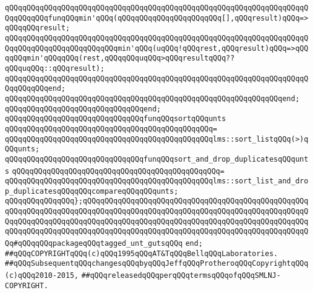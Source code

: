 \verb|qQQqqQQqqQQqqQQqqQQqqQQqqQQqqQQqqQQqqQQqqQQqqQQqqQQqqQQqqQQqqQQqqQQqqQQqqQQqqQQqfunqQQqmin'qQQq(qQQqqQQqqQQqqQQqqQQqqQQq[],qQQqresult)qQQq=>qQQqqQQqresult;|\newline
\verb|qQQqqQQqqQQqqQQqqQQqqQQqqQQqqQQqqQQqqQQqqQQqqQQqqQQqqQQqqQQqqQQqqQQqqQQqqQQqqQQqqQQqqQQqqQQqqQQqmin'qQQq(uqQQq!qQQqrest,qQQqresult)qQQq=>qQQqqQQqmin'qQQqqQQq(rest,qQQqqQQquqQQq>qQQqresultqQQq??qQQquqQQq::qQQqresult);|\newline
\verb|qQQqqQQqqQQqqQQqqQQqqQQqqQQqqQQqqQQqqQQqqQQqqQQqqQQqqQQqqQQqqQQqqQQqqQQqqQQqqQQqend;|\newline
\verb|qQQqqQQqqQQqqQQqqQQqqQQqqQQqqQQqqQQqqQQqqQQqqQQqqQQqqQQqqQQqqQQqend;|\newline
\verb|qQQqqQQqqQQqqQQqqQQqqQQqqQQqqQQqend;|\newline
\newline
\verb|qQQqqQQqqQQqqQQqqQQqqQQqqQQqqQQqfunqQQqsortqQQqunts|\newline
\verb|qQQqqQQqqQQqqQQqqQQqqQQqqQQqqQQqqQQqqQQqqQQqqQQq=|\newline
\verb|qQQqqQQqqQQqqQQqqQQqqQQqqQQqqQQqqQQqqQQqqQQqqQQqlms::sort_listqQQq(>)qQQqunts;|\newline
\newline
\verb|qQQqqQQqqQQqqQQqqQQqqQQqqQQqqQQqfunqQQqsort_and_drop_duplicatesqQQqunts|\newline
\verb|qQQqqQQqqQQqqQQqqQQqqQQqqQQqqQQqqQQqqQQqqQQqqQQq=|\newline
\verb|qQQqqQQqqQQqqQQqqQQqqQQqqQQqqQQqqQQqqQQqqQQqqQQqlms::sort_list_and_drop_duplicatesqQQqqQQqcompareqQQqqQQqunts;|\newline
\verb|qQQqqQQqqQQqqQQq};qQQqqQQqqQQqqQQqqQQqqQQqqQQqqQQqqQQqqQQqqQQqqQQqqQQqqQQqqQQqqQQqqQQqqQQqqQQqqQQqqQQqqQQqqQQqqQQqqQQqqQQqqQQqqQQqqQQqqQQqqQQqqQQqqQQqqQQqqQQqqQQqqQQqqQQqqQQqqQQqqQQqqQQqqQQqqQQqqQQqqQQqqQQqqQQqqQQqqQQqqQQqqQQqqQQqqQQqqQQqqQQqqQQqqQQqqQQqqQQqqQQqqQQqqQQqqQQqqQQqqQQq#qQQqqQQqpackageqQQqtagged_unt_gutsqQQq|\newline
\verb|end;|\newline
\newline
\newline
\newline
\newline
\verb|##qQQqCOPYRIGHTqQQq(c)qQQq1995qQQqAT&TqQQqBellqQQqLaboratories.|\newline
\verb|##qQQqSubsequentqQQqchangesqQQqbyqQQqJeffqQQqProtheroqQQqCopyrightqQQq(c)qQQq2010-2015,|\newline
\verb|##qQQqreleasedqQQqperqQQqtermsqQQqofqQQqSMLNJ-COPYRIGHT.|\newline

